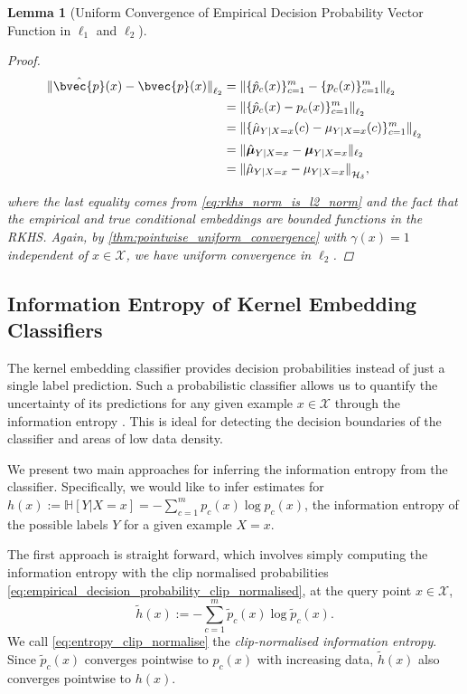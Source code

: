 \documentclass{article}
\newtheorem{lemma}[theorem]{Lemma}
\begin{document}
\begin{lemma}[Uniform Convergence of Empirical Decision Probability Vector Function in $\ell_{1}$ and $\ell_{2}$]
\begin{proof}
			\begin{equation}
			\begin{aligned}
				{\lVert \hat{\bvec{p}}(x)  - \bvec{p}(x) \rVert}_{\ell_{2}} &= {\lVert \{ \hat{p}_{c}(x) \}_{c = 1}^{m} - \{ p_{c}(x) \}_{c = 1}^{m} \rVert}_{\ell_{2}} \\
				&= {\lVert \{ \hat{p}_{c}(x) - p_{c}(x) \}_{c = 1}^{m} \rVert}_{\ell_{2}} \\
				&= {\lVert \{ \hat{\mu}_{Y | X = x}(c) - \mu_{Y | X = x}(c)\}_{c = 1}^{m} \rVert}_{\ell_{2}} \\
				&= \| \hat{\bm{\mu}}_{Y | X = x} - \bm{\mu}_{Y | X = x}  \|_{\ell_{2}} \\
				&= {\lVert \hat{\mu}_{Y | X = x} - \mu_{Y | X = x}\rVert}_{\mathcal{H}_{\delta}},
			\end{aligned}
			\end{equation}
			
			where the last equality comes from \eqref{eq:rkhs_norm_is_l2_norm} and the fact that the empirical and true conditional embeddings are bounded functions in the RKHS. Again, by \cref{thm:pointwise_uniform_convergence} with $\gamma(x) = 1$ independent of $x \in \mathcal{X}$, we have uniform convergence in $\ell_{2}$.
		\end{proof}
	\end{lemma}
		
	\subsection{Information Entropy of Kernel Embedding Classifiers}
	\label{app:information_entropy}
	
		The kernel embedding classifier provides decision probabilities instead of just a single label prediction. Such a probabilistic classifier allows us to quantify the uncertainty of its predictions for any given example $x \in \mathcal{X}$ through the information entropy \citep{shannon1951prediction, jaynes1957information}. This is ideal for detecting the decision boundaries of the classifier and areas of low data density.
		
		We present two main approaches for inferring the information entropy from the classifier. Specifically, we would like to infer estimates for $h(x) := \mathbb{H}[Y | X = x] = - \sum_{c = 1}^{m} p_{c}(x) \log{p_{c}(x)} $, the information entropy of the possible labels $Y$ for a given example $X = x$.
		
		The first approach is straight forward, which involves simply computing the information entropy with the clip normalised probabilities \eqref{eq:empirical_decision_probability_clip_normalised}, at the query point $x \in \mathcal{X}$,
		\begin{equation}
		\tilde{h}(x) := - \sum_{c = 1}^{m} \tilde{p}_{c}(x) \log{\tilde{p}_{c}(x)}.
		\label{eq:entropy_clip_normalise}
		\end{equation}
		We call \eqref{eq:entropy_clip_normalise} the \textit{clip-normalised information entropy}. Since $\tilde{p}_{c}(x)$ converges pointwise to $p_{c}(x)$ with increasing data, $\tilde{h}(x)$ also converges pointwise to $h(x)$.
		
\end{document}
